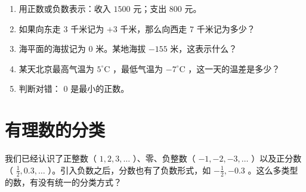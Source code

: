 \begin{practice}


\begin{enumerate}
  \item 用正数或负数表示：收入 $1500$ 元；支出 $800$ 元。
  \item 如果向东走 $3$ 千米记为 $+3$ 千米，那么向西走 $7$ 千米记为多少？
  \item 海平面的海拔记为 $0$ 米。某地海拔 $-155$ 米，这表示什么？
  \item 某天北京最高气温为 $5^\circ\text{C}$ ，最低气温为 $-7^\circ\text{C}$ ，这一天的温差是多少？
  \item 判断对错： $0$ 是最小的正数。
\end{enumerate}


\end{practice}

\section*{有理数的分类}


\begin{explore}


我们已经认识了正整数（ $1, 2, 3, \ldots$ ）、零、负整数（ $-1, -2, -3, \ldots$ ）以及正分数（ $\frac{1}{2}, 0.3, \ldots$ ）。引入负数之后，分数也有了负数形式，如 $-\frac{1}{2}, -0.3$ 。这么多类型的数，有没有统一的分类方式？

\end{explore}

